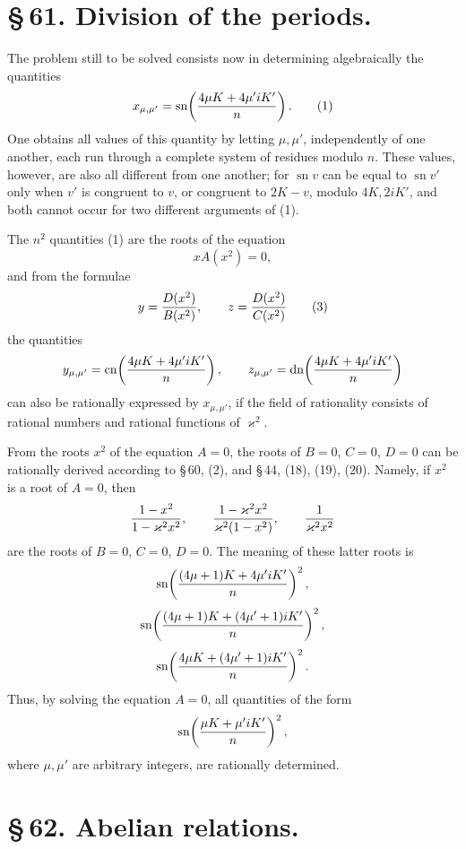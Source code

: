 \documentclass[11pt]{article}
\providecommand{\sn}{\operatorname{sn}}
\providecommand{\cn}{\operatorname{cn}}
\providecommand{\dn}{\operatorname{dn}}
\begin{document}
\section*{\S\,61. Division of the periods.}

The problem still to be solved consists now in determining algebraically the quantities
\begin{equation}
x_{\mu,\mu'}=\sn\!\left({4\mu K+4\mu'iK'\over n}\right).
\tag{1}
\end{equation}
One obtains all values of this quantity by letting $\mu,\mu'$, independently of one another,
each run through a complete system of residues modulo $n$. These values, however, are
also all different from one another; for $\sn v$ can be equal to $\sn v'$ only when $v'$ is
congruent to $v$, or congruent to $2K-v$, modulo $4K,2iK'$, and both cannot occur for
two different arguments of (1).

The $n^2$ quantities (1) are the roots of the equation
\begin{equation}
xA(x^2)=0,
\tag{2}
\end{equation}
and from the formulae
\begin{equation}
y={D(x^2)\over B(x^2)},\qquad z={D(x^2)\over C(x^2)}
\tag{3}
\end{equation}
the quantities
\[
y_{\mu,\mu'}=\cn\!\left({4\mu K+4\mu'iK'\over n}\right),\qquad
z_{\mu,\mu'}=\dn\!\left({4\mu K+4\mu'iK'\over n}\right)
\]
can also be rationally expressed by $x_{\mu,\mu'}$, if the field of rationality consists of
rational numbers and rational functions of $\varkappa^2$.

From the roots $x^2$ of the equation $A=0$, the roots of $B=0$, $C=0$, $D=0$ can be
rationally derived according to \S\,60, (2), and \S\,44, (18), (19), (20). Namely, if $x^2$
is a root of $A=0$, then
\[
{1-x^2\over1-\varkappa^2x^2},\qquad
{1-\varkappa^2x^2\over\varkappa^2(1-x^2)},\qquad
{1\over\varkappa^2x^2}
\]
are the roots of $B=0$, $C=0$, $D=0$. The meaning of these latter roots is
\[
\sn\!\left({(4\mu+1)K+4\mu'iK'\over n}\right)^2,
\]
\[
\sn\!\left({(4\mu+1)K+(4\mu'+1)iK'\over n}\right)^2,
\]
\[
\sn\!\left({4\mu K+(4\mu'+1)iK'\over n}\right)^2.
\]
Thus, by solving the equation $A=0$, all quantities of the form
\[
\sn\!\left({\mu K+\mu'iK'\over n}\right)^2,
\]
where $\mu,\mu'$ are arbitrary integers, are rationally determined.

\section*{\S\,62. Abelian relations.}
\end{document}
